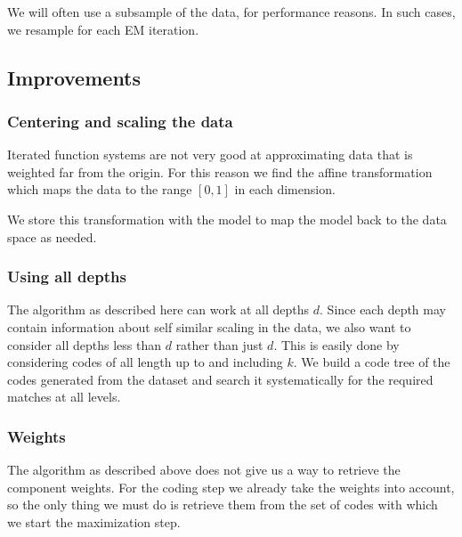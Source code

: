 \documentclass[10pt,a4paper,oneside]{article}
\theoremstyle{definition}
\begin{document}
We will often use a subsample of the data, for performance reasons. In such cases, we resample for each EM iteration.
 
\subsection*{Improvements}

\subsubsection*{Centering and scaling the data}

Iterated function systems are not very good at approximating data that is weighted far from the origin. For this reason we find the affine transformation which maps the data to the range $[0,1]$ in each dimension.

We store this transformation with the model to map the model back to the data space as needed.

\subsubsection*{Using all depths}

The algorithm as described here can work at all depths $d$. Since each depth may contain information about self similar scaling in the data, we also want to consider all depths less than $d$ rather than just $d$. This is easily done by considering codes of all length up to and including $k$. We build a code tree of the codes generated from the dataset and search it systematically for the required matches at all levels.



\subsubsection*{Weights}

The algorithm as described above does not give us a way to retrieve the component weights. For the coding step we already take the weights into account, so the only thing we must do is retrieve them from the set of codes with which we start the maximization step.
\end{document}
